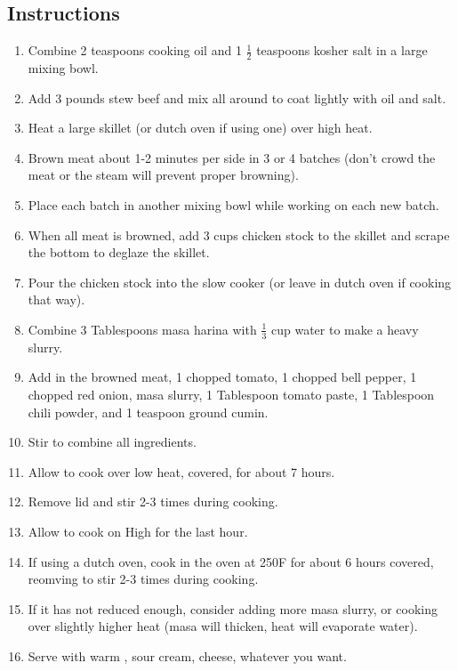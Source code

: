 \begin{multicols}{2}
\subsection*{Instructions}
\begin{enumerate}
    \item Combine 2 teaspoons cooking oil and 1 \( \frac{1}{2} \) teaspoons kosher salt in a large mixing bowl.
    \item Add 3 pounds stew beef and mix all around to coat lightly with oil and salt.
    \item Heat a large skillet (or dutch oven if using one) over high heat.
    \item Brown meat about 1-2 minutes per side in 3 or 4 batches (don't crowd the meat or the steam will prevent proper browning).
    \item Place each batch in another mixing bowl while working on each new batch.
    \item When all meat is browned, add 3 cups chicken stock to the skillet and scrape the bottom to deglaze the skillet.
    \item Pour the chicken stock into the slow cooker (or leave in dutch oven if cooking that way).
    \item Combine 3 Tablespoons masa harina with \( \frac{1}{3} \) cup water to make a heavy slurry.
    \item Add in the browned meat, 1 chopped tomato, 1 chopped bell pepper, 1 chopped red onion, masa slurry, 1 Tablespoon tomato paste, 1 Tablespoon chili powder, and 1 teaspoon ground cumin.
    \item Stir to combine all ingredients.
    \item Allow to cook over low heat, covered, for about 7 hours.
    \item Remove lid and stir 2-3 times during cooking.
    \item Allow to cook on High for the last hour.
    \item If using a dutch oven, cook in the oven at 250F for about 6 hours covered, reomving to stir 2-3 times during cooking.
    \item If it has not reduced enough, consider adding more masa slurry, or cooking over slightly higher heat (masa will thicken, heat will evaporate water).
    \item Serve with warm , sour cream, cheese, whatever you want.
\end{enumerate}


\end{multicols}
